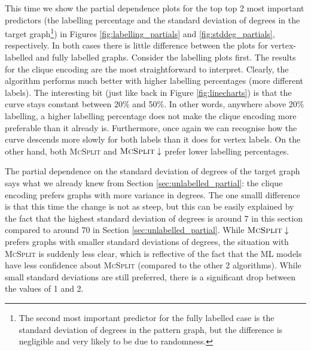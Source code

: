 \documentclass{l4proj}
\theoremstyle{definition}
\theoremstyle{remark}
\begin{document}
This time we show the partial dependence plots for the top top 2 most
important predictors (the labelling percentage and the standard deviation of
degrees in the target graph\footnote{The second most important predictor for the
fully labelled case is the standard deviation of degrees in the pattern graph,
but the difference is negligible and very likely to be due to randomness.}) in
Figures \ref{fig:labelling_partials} and \ref{fig:stddeg_partials},
respectively. In both cases there is little difference between the plots for
vertex-labelled and fully labelled graphs. Consider the labelling plots first.
The results for the clique encoding are the most straightforward to interpret.
Clearly, the algorithm performs much better with higher labelling percentages
(more different labels). The interesting bit (just like back in Figure
\ref{fig:linecharts}) is that the curve stays constant between 20\% and 50\%. In
other words, anywhere above 20\% labelling, a higher labelling percentage does
not make the clique encoding more preferable than it already is. Furthermore,
once again we can recognise how the curve descends more slowly for both labels
than it does for vertex labels. On the other hand, both \textsc{McSplit} and
$\textsc{McSplit}\downarrow$ prefer lower labelling percentages.

The partial dependence on the standard deviation of degrees of the target graph
says what we already knew from Section \ref{sec:unlabelled_partial}: the clique
encoding prefers graphs with more variance in degrees. The one smalll difference
is that this time the change is not as steep, but this can be easily explained
by the fact that the highest standard deviation of degrees is around 7 in this
section compared to around 70 in Section \ref{sec:unlabelled_partial}. While
$\textsc{McSplit}\downarrow$ prefers graphs with smaller standard deviations of
degrees, the situation with \textsc{McSplit} is suddenly less clear, which is
reflective of the fact that the ML models have less confidence about
\textsc{McSplit} (compared to the other 2 algorithms). While small standard
deviations are still preferred, there is a significant drop between the values
of 1 and 2.
\end{document}
